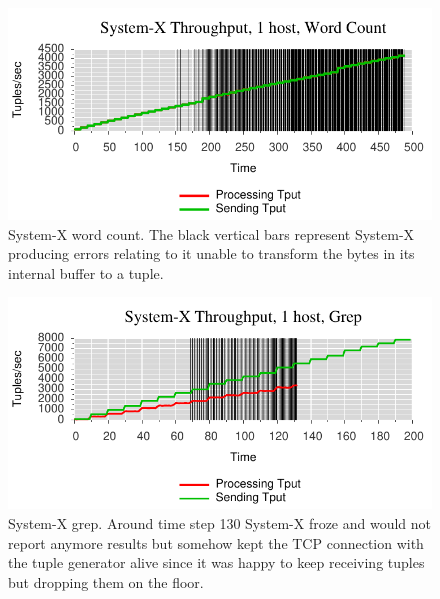 \begin{figure}[t]
\centering
\includegraphics[width=1\linewidth]{figures/sb1_tput.pdf}
\caption{System-X word count. The black vertical bars represent System-X producing errors relating to it unable to transform the bytes in its internal buffer to a tuple.}
\label{fig:label-me-if-you-want}
\end{figure}

\begin{figure}[t]
\centering
\includegraphics[width=1\linewidth]{figures/sb2_tput.pdf}
\caption{System-X grep. Around time step 130 System-X froze and would not report anymore results but somehow kept the TCP connection with the tuple generator alive since it was happy to keep receiving tuples but dropping them on the floor.}
\label{fig:label-me-if-you-want}
\end{figure}


